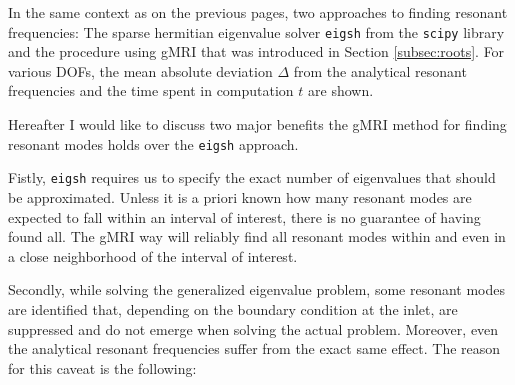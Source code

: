\documentclass[11pt, a4paper]{article}
\begin{document}
\begin{table}[ht]
    \caption{In the same context as on the previous pages, two approaches to
    finding resonant frequencies: The sparse hermitian eigenvalue solver
    \texttt{eigsh} from the \texttt{scipy} library and the procedure using
    \acrshort{gMRI} that was introduced in Section \ref{subsec:roots}. For
    various \acrshort{DOF}s, the mean absolute deviation $\Delta$ from the analytical
    resonant frequencies and the time spent in computation $t$ are shown.}
    \label{tab:rectangular_cavity_comparison}
    
\end{table}

Hereafter I would like to discuss two major benefits the \acrshort{gMRI} method
for finding resonant modes holds over the \texttt{eigsh} approach.

Fistly, \texttt{eigsh} requires us to specify the exact number of eigenvalues that
should be approximated. Unless it is a priori known how many resonant modes are
expected to fall within an interval of interest, there is no guarantee of having
found all. The \acrshort{gMRI} way will reliably find all resonant modes within
and even in a close neighborhood of the interval of interest.

Secondly, while solving the generalized eigenvalue problem, some resonant modes
are identified that, depending on the boundary condition at the inlet, are 
suppressed and do not emerge when solving the actual problem. Moreover, even
the analytical resonant frequencies suffer from the exact same effect. The reason
for this caveat is the following:
\end{document}
